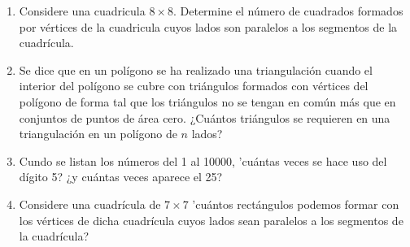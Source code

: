 \begin{enumerate}
    \item Considere una cuadricula $8\times8$. Determine el número de cuadrados formados por vértices de la cuadricula cuyos lados son paralelos a los segmentos de la cuadrícula.

    \item Se dice que en un polígono se ha realizado una triangulación cuando el interior del polígono se cubre con triángulos formados con vértices del polígono de forma tal que los triángulos no se tengan en común más que en conjuntos de puntos de área cero. ¿Cuántos triángulos se requieren en una triangulación en un polígono de $n$ lados?

    \item Cundo se listan los números del 1 al 10000, 'cuántas veces se hace uso del dígito 5? ¿y cuántas veces aparece el 25?

    \item Considere una cuadrícula de $7 \times 7$ 'cuántos rectángulos podemos formar con los vértices de dicha cuadrícula cuyos lados sean paralelos a los segmentos de la cuadrícula?
    

\end{enumerate}
